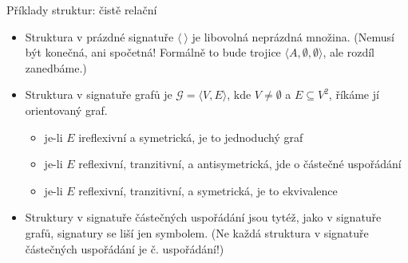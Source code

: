 \documentclass{beamer}
\begin{document}
\begin{frame}{Příklady struktur: čistě relační}
    
    \begin{itemize}
        \item Struktura \alert{v prázdné signatuře} $\langle\ \rangle$ je libovolná neprázdná množina. (Nemusí být konečná, ani spočetná! Formálně to bude trojice $\langle A,\emptyset,\emptyset\rangle$, ale rozdíl zanedbáme.)            

        \item Struktura \alert{v signatuře grafů} je $\mathcal G=\langle V,E\rangle$, kde $V\neq\emptyset$ a $E\subseteq V^2$, říkáme jí \alert{orientovaný graf}. 
        \begin{itemize}
            \item je-li $E$ ireflexivní a symetrická, je to \alert{jednoduchý} graf
            \item je-li $E$ reflexivní, tranzitivní, a antisymetrická, jde o \alert{částečné uspořádání}
            \item je-li $E$ reflexivní, tranzitivní, a symetrická, je to \alert{ekvivalence}
        \end{itemize}
        \item Struktury \alert{v signatuře částečných uspořádání} jsou tytéž, jako v signatuře grafů, signatury se liší jen symbolem. (Ne každá struktura v signatuře částečných uspořádání je č. uspořádání!)
    \end{itemize}

\end{frame}
\end{document}
